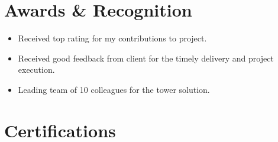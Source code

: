 \documentclass[letterpaper,10pt]{article}
\newcommand{\resumeItem}[1]{
  \item\small{
    {#1 \vspace{-2pt}}
  }
}
\newcommand{\resumeItemListStart}{\begin{itemize}}
\newcommand{\resumeItemListEnd}{\end{itemize}\vspace{-5pt}}
\begin{document}
\section{Awards \& Recognition}


      \resumeItemListStart
         
         \resumeItem{Received top rating for my contributions to project.}
         \resumeItem{Received good feedback from client for the timely delivery and project execution.}
         \resumeItem{Leading team of 10 colleagues for the tower solution.}

    \resumeItemListEnd
      

\section{Certifications}
 \begin{itemize}[leftmargin=0.15in, label={}]
    \small{\item{

     {
      \href{https://www.credly.com/badges/8f347325-108c-40a7-9478-87894782534a/public_url}{\textbf{AWS Certified Cloud Practitioner CLF-C02}}
    
    }}



 \end{itemize}


    
\end{document}
